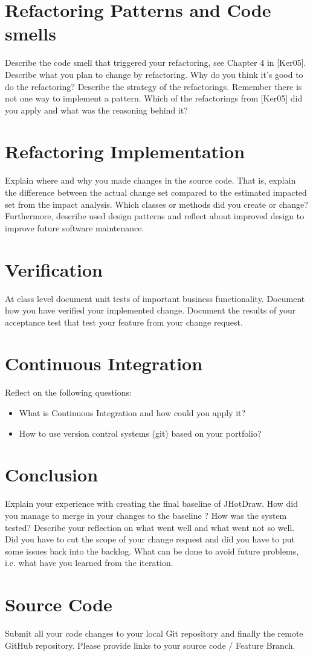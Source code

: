 \documentclass{article}
\begin{document}
\section{Refactoring Patterns and Code smells}
Describe the code smell that triggered your refactoring, see Chapter 4 in [Ker05]. 
Describe what you plan to change by refactoring. 
Why do you think it's good to do the refactoring?
Describe the strategy of the refactorings. Remember there is not one way to implement a pattern.
Which of the refactorings from [Ker05] did you apply and what was the reasoning behind it?

\section{Refactoring Implementation}
Explain where and why you made changes in the source code.  That is, explain the difference between the actual change set compared to the estimated impacted set from the impact analysis. Which classes or methods did you create or change? Furthermore, describe used design patterns and reflect about improved design to improve future software maintenance.

\section{Verification}
At class level document unit tests of important business functionality.
Document how you have verified your implemented change. 
Document the results of your acceptance test that test your feature from your change request.

\section{Continuous Integration}
Reflect on the following questions:
\begin{itemize}
    \item What is Continuous Integration and how could you apply it?
    \item How to use version control systems (git) based on your portfolio?
\end{itemize}

\section{Conclusion}
Explain your experience with creating the final baseline of JHotDraw.
How did you manage to merge in your changes to the baseline ?
How was the system tested?
Describe your reflection on what went well and what went not so well. 
Did you have to cut the scope of your change request and did you have to put some issues back into the backlog. 
What can be done to avoid future problems, i.e. what have you learned from the iteration.

\section{Source Code}
Submit all your code changes to your local Git repository and finally the remote GitHub repository. 
Please provide links to your source code / Feature Branch. 



\end{document}
